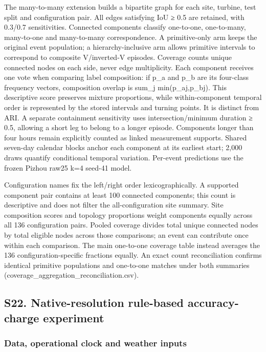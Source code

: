\documentclass[a4paper,11pt]{article}
\begin{document}
The many-to-many extension builds a bipartite graph for each site, turbine, test split and configuration pair. All edges satisfying IoU ≥ 0.5 are retained, with 0.3/0.7 sensitivities. Connected components classify one-to-one, one-to-many, many-to-one and many-to-many correspondence. A primitive-only arm keeps the original event population; a hierarchy-inclusive arm allows primitive intervals to correspond to composite V/inverted-V episodes. Coverage counts unique connected nodes on each side, never edge multiplicity. Each component receives one vote when comparing label composition: if p\_a and p\_b are its four-class frequency vectors, composition overlap is sum\_j min(p\_aj,p\_bj). This descriptive score preserves mixture proportions, while within-component temporal order is represented by the stored intervals and turning points. It is distinct from ARI. A separate containment sensitivity uses intersection/minimum duration ≥ 0.5, allowing a short leg to belong to a longer episode. Components longer than four hours remain explicitly counted as linked measurement supports. Shared seven-day calendar blocks anchor each component at its earliest start; 2,000 draws quantify conditional temporal variation. Per-event predictions use the frozen Pizhou raw25 k=4 seed-41 model.

Configuration names fix the left/right order lexicographically. A supported component pair contains at least 100 connected components; this count is descriptive and does not filter the all-configuration site summary. Site composition scores and topology proportions weight components equally across all 136 configuration pairs. Pooled coverage divides total unique connected nodes by total eligible nodes across those comparisons; an event can contribute once within each comparison. The main one-to-one coverage table instead averages the 136 configuration-specific fractions equally. An exact count reconciliation confirms identical primitive populations and one-to-one matches under both summaries (coverage\_aggregation\_reconciliation.csv).

\subsection{S22. Native-resolution rule-based accuracy-charge experiment}\label{s22.-native-resolution-rule-based-accuracy-charge-experiment}

\subsubsection{Data, operational clock and weather inputs}\label{data-operational-clock-and-weather-inputs}
\end{document}
